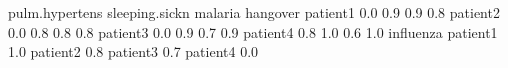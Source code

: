 \begin{Schunk}
% --begin: "comp.circ.unavoid"
\begin{Soutput}
         pulm.hypertens sleeping.sickn malaria hangover
patient1            0.0            0.9     0.9      0.8
patient2            0.0            0.8     0.8      0.8
patient3            0.0            0.9     0.7      0.9
patient4            0.8            1.0     0.6      1.0
         influenza
patient1       1.0
patient2       0.8
patient3       0.7
patient4       0.0
\end{Soutput}
%
% --end: "comp.circ.unavoid"
\end{Schunk}
